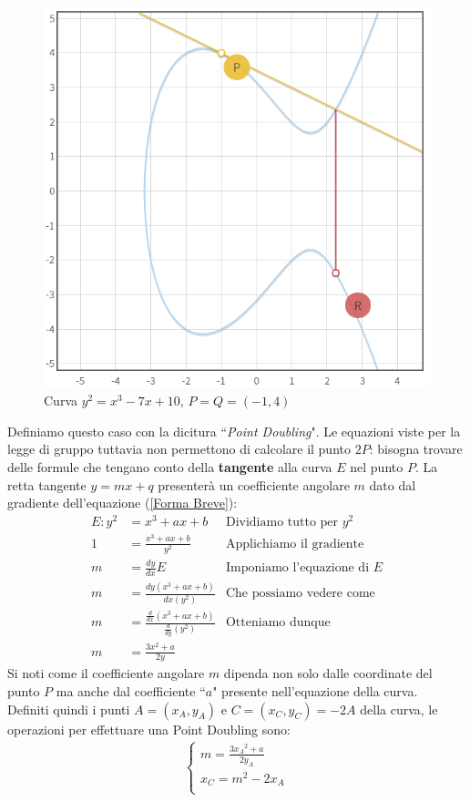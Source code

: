\documentclass[a4paper,12pt]{tesiinfo}
\newcommand\ddfrac[2]{\frac{\displaystyle #1}{\displaystyle #2}}
\begin{document}
\begin{enumerate}
 \begin{figure}[H]
  \includegraphics[width=.6\textwidth,center]{PA_P+P}
  \caption{Curva $y^2 = x^3-7x+10$, $P=Q=(-1, 4)$}
 \end{figure}
 \label{PointDoubling}
Definiamo questo caso con la dicitura ``\textit{Point Doubling}". Le equazioni viste per la legge di gruppo tuttavia non permettono di calcolare il punto $2P$: bisogna trovare delle formule che tengano conto della \textbf{tangente} alla curva $E$ nel punto $P$. La retta tangente $y = mx+q$ presenter\`a un coefficiente angolare $m$ dato dal gradiente dell'equazione (\ref{Forma Breve}):
\begin{align*}
E : y^2 &= x^3 + ax + b &\text{Dividiamo tutto per $y^2$}\\
1 &= \ddfrac{x^3 + ax + b}{y^2} &\text{Applichiamo il gradiente}\\
m &= \ddfrac{dy}{dx}E &\text{Imponiamo l'equazione di $E$} \\
m &= \ddfrac{dy (x^3 + ax + b)}{dx (y^2)} &\text{Che possiamo vedere come}\\
m &= \ddfrac{\ddfrac{d}{dx}(x^3 + ax + b)}{\ddfrac{d}{dy}(y^2)} &\text{Otteniamo dunque}\\
m &= \ddfrac{3x^2 + a}{2y}
\end{align*}
Si noti come il coefficiente angolare $m$ dipenda non solo dalle coordinate del punto $P$ ma anche dal coefficiente ``$a$" presente nell'equazione della curva.
\\
Definiti quindi i punti $A = (x_A, y_A)$ e $C=(x_C, y_C) = -2A$ della curva, le operazioni per effettuare una Point Doubling sono:
\begin{gather}
\begin{cases}
m = \ddfrac{3{x_A}^2 + a}{2y_A}\\
x_C = m^2 - 2x_A\\

\end{cases}
\end{gather}
\end{enumerate}
\end{document}

